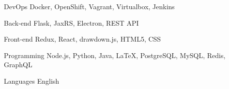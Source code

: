 

\begin{cvskills}

	\cvskill
	{DevOps} %
	{Docker, OpenShift, Vagrant, Virtualbox, Jenkins} %

	\cvskill
	{Back-end} %
	{Flask, JaxRS, Electron, REST API} %

	\cvskill
	{Front-end} %
	{Redux, React, drawdown.js, HTML5, CSS} %

	\cvskill
	{Programming} %
	{Node.js, Python, Java, LaTeX, PostgreSQL, MySQL, Redis, GraphQL} %

	\cvskill
	{Languages} %
	{English} %

\end{cvskills}
